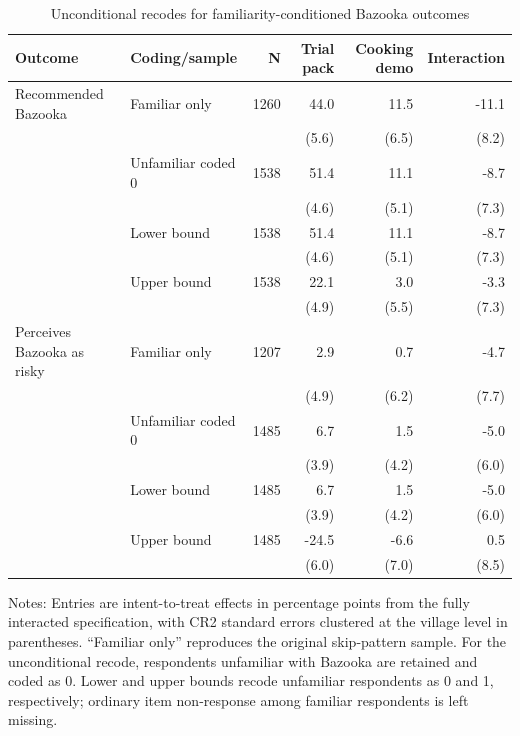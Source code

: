 \begin{table}[!htbp]
\centering
\footnotesize
\caption{Unconditional recodes for familiarity-conditioned Bazooka outcomes}
\label{tab:appendix-unconditional-recodes}
\begin{tabular}{llrrrr}
\hline\hline
Outcome & Coding/sample & N & Trial pack & Cooking demo & Interaction \\
\hline
Recommended Bazooka & Familiar only & 1260 & 44.0 & 11.5 & -11.1 \\
 &  &  & (5.6) & (6.5) & (8.2) \\
 & Unfamiliar coded 0 & 1538 & 51.4 & 11.1 & -8.7 \\
 &  &  & (4.6) & (5.1) & (7.3) \\
 & Lower bound & 1538 & 51.4 & 11.1 & -8.7 \\
 &  &  & (4.6) & (5.1) & (7.3) \\
 & Upper bound & 1538 & 22.1 & 3.0 & -3.3 \\
 &  &  & (4.9) & (5.5) & (7.3) \\
\hline
Perceives Bazooka as risky & Familiar only & 1207 & 2.9 & 0.7 & -4.7 \\
 &  &  & (4.9) & (6.2) & (7.7) \\
 & Unfamiliar coded 0 & 1485 & 6.7 & 1.5 & -5.0 \\
 &  &  & (3.9) & (4.2) & (6.0) \\
 & Lower bound & 1485 & 6.7 & 1.5 & -5.0 \\
 &  &  & (3.9) & (4.2) & (6.0) \\
 & Upper bound & 1485 & -24.5 & -6.6 & 0.5 \\
 &  &  & (6.0) & (7.0) & (8.5) \\
\hline\hline
\end{tabular}
\begin{minipage}{0.92\textwidth}
\scriptsize
Notes: Entries are intent-to-treat effects in percentage points from the fully interacted specification, with CR2 standard errors clustered at the village level in parentheses. ``Familiar only'' reproduces the original skip-pattern sample. For the unconditional recode, respondents unfamiliar with Bazooka are retained and coded as 0. Lower and upper bounds recode unfamiliar respondents as 0 and 1, respectively; ordinary item non-response among familiar respondents is left missing.
\end{minipage}
\end{table}
